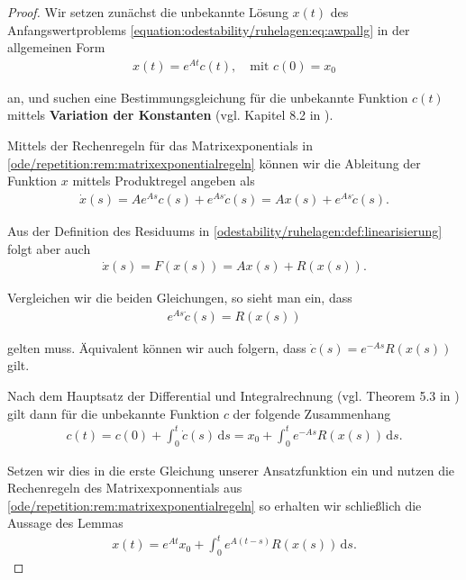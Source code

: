 \documentclass[letterpaper,10pt,german]{jupyterBook}
\begin{document}
\begin{proof}
 Wir setzen zunächst die unbekannte Lösung \(x(t)\) des Anfangswertproblems \eqref{equation:odestability/ruhelagen:eq:awpallg} in der allgemeinen Form
\begin{align*}
x(t) = e^{At}c(t),\quad \text{mit }c(0) = x_0
\end{align*}
\par
an, und suchen eine Bestimmungsgleichung für die unbekannte Funktion \(c(t)\) mittels \textbf{Variation der Konstanten} (vgl. Kapitel 8.2 in \cite{Ten21}).

\par
Mittels der Rechenregeln für das Matrixexponentials in \cref{ode/repetition:rem:matrixexponentialregeln} können wir die Ableitung der Funktion \(x\) mittels Produktregel angeben als
\begin{align*}
\dot{x}(s) = A e^{As}c(s)+ e^{As}\dot{c}(s) = Ax(s) + e^{As}\dot{c}(s).
\end{align*}
\par
Aus der Definition des Residuums in \cref{odestability/ruhelagen:def:linearisierung} folgt aber auch
\begin{align*}
\dot{x}(s) = F(x(s)) = Ax(s) + R(x(s)).
\end{align*}
\par
Vergleichen wir die beiden Gleichungen, so sieht man ein, dass
\begin{align*}
e^{As}\dot{c}(s) = R(x(s))
\end{align*}
\par
gelten muss.
Äquivalent können wir auch folgern, dass \(\dot{c}(s) = e^{-As}R(x(s))\) gilt.

\par
Nach dem Hauptsatz der Differential  und Integralrechnung (vgl. Theorem 5.3 in \cite{Ten21}) gilt dann für die unbekannte Funktion \(c\) der folgende Zusammenhang
\begin{align*}
c(t) = c(0) + \int_0^t \dot{c}(s)\, \mathrm{d}s = x_0+ \int_0^t e^{-As}R(x(s)) \, \mathrm{d}s.
\end{align*}
\par
Setzen wir dies in die erste Gleichung unserer Ansatzfunktion ein und nutzen die Rechenregeln des Matrixexponnentials aus \cref{ode/repetition:rem:matrixexponentialregeln}  so erhalten wir schließlich die Aussage des Lemmas
\begin{align*}
x(t) = e^{At}x_0+ \int_0^t e^{A(t-s)}R(x(s)) \, \mathrm{d}s.
\end{align*}\end{proof}
\end{document}
